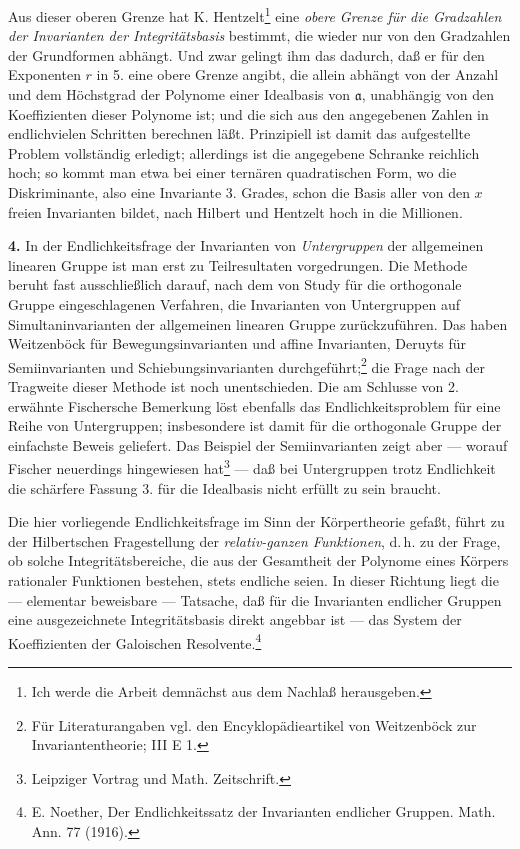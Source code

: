 \documentclass[11pt]{article}
\providecommand{\ma}{\mathfrak a}
\begin{document}
Aus dieser oberen Grenze hat K. Hentzelt\footnote{Ich werde die Arbeit demnächst aus dem Nachlaß herausgeben.} eine \emph{obere Grenze für die Gradzahlen der Invarianten der Integritätsbasis} bestimmt, die wieder nur von den Gradzahlen der Grundformen abhängt. Und zwar gelingt ihm das dadurch, daß er für den Exponenten $r$ in 5. eine obere Grenze angibt, die allein abhängt von der Anzahl und dem Höchstgrad der Polynome einer Idealbasis von $\ma$, unabhängig von den Koeffizienten dieser Polynome ist; und die sich aus den angegebenen Zahlen in endlichvielen Schritten berechnen läßt. Prinzipiell ist damit das aufgestellte Problem vollständig erledigt; allerdings ist die angegebene Schranke reichlich hoch; so kommt man etwa bei einer ternären quadratischen Form, wo die Diskriminante, also eine Invariante 3. Grades, schon die Basis aller von den $x$ freien Invarianten bildet, nach Hilbert und Hentzelt hoch in die Millionen.

\textbf{4.} In der Endlichkeitsfrage der Invarianten von \emph{Untergruppen} der allgemeinen linearen Gruppe ist man erst zu Teilresultaten vorgedrungen. Die Methode beruht fast ausschließlich darauf, nach dem von Study für die orthogonale Gruppe eingeschlagenen Verfahren, die Invarianten von Untergruppen auf Simultaninvarianten der allgemeinen linearen Gruppe zurückzuführen. Das haben Weitzenböck für Bewegungsinvarianten und affine Invarianten, Deruyts für Semiinvarianten und Schiebungsinvarianten durchgeführt;\footnote{Für Literaturangaben vgl. den Encyklopädieartikel von Weitzenböck zur Invariantentheorie; III E 1.} die Frage nach der Tragweite dieser Methode ist noch unentschieden. Die am Schlusse von 2. erwähnte Fischersche Bemerkung löst ebenfalls das Endlichkeitsproblem für eine Reihe von Untergruppen; insbesondere ist damit für die orthogonale Gruppe der einfachste Beweis geliefert. Das Beispiel der Semiinvarianten zeigt aber --- worauf Fischer neuerdings hingewiesen hat\footnote{Leipziger Vortrag und Math. Zeitschrift.} --- daß bei Untergruppen trotz Endlichkeit die schärfere Fassung 3. für die Idealbasis nicht erfüllt zu sein braucht.

Die hier vorliegende Endlichkeitsfrage im Sinn der Körpertheorie gefaßt, führt zu der Hilbertschen Fragestellung der \emph{relativ-ganzen Funktionen}, d.\,h. zu der Frage, ob solche Integritätsbereiche, die aus der Gesamtheit der Polynome eines Körpers rationaler Funktionen bestehen, stets endliche seien. In dieser Richtung liegt die --- elementar beweisbare --- Tatsache, daß für die Invarianten endlicher Gruppen eine ausgezeichnete Integritätsbasis direkt angebbar ist --- das System der Koeffizienten der Galoischen Resolvente.\footnote{E. Noether, Der Endlichkeitssatz der Invarianten endlicher Gruppen. Math. Ann. 77 (1916).}
\end{document}
